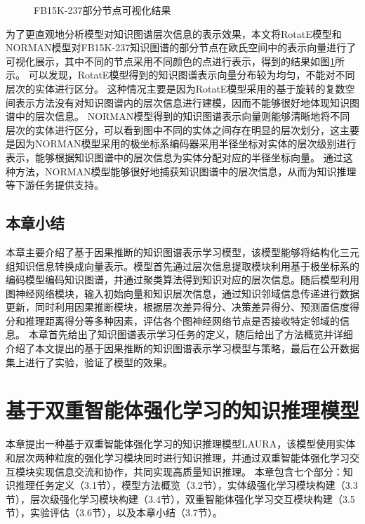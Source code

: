 \documentclass[algorithmlist, AutoFakeBold, AutoFakeSlant, figurelist, tablelist, nomlist, engineering]{seuthesix}
\begin{document}
\begin{figure}[t]
  \centering
  \caption{FB15K-237部分节点可视化结果}
  \label{Experiment1_figures}
\end{figure}
为了更直观地分析模型对知识图谱层次信息的表示效果，本文将RotatE模型和NORMAN模型对FB15K-237知识图谱的部分节点在欧氏空间中的表示向量进行了可视化展示，其中不同的节点采用不同颜色的点进行表示，得到的结果如图\ref{Experiment1_figures}所示。
可以发现，RotatE模型得到的知识图谱表示向量分布较为均匀，不能对不同层次的实体进行区分。
这种情况主要是因为RotatE模型采用的基于旋转的复数空间表示方法没有对知识图谱内的层次信息进行建模，因而不能够很好地体现知识图谱中的层次信息。
NORMAN模型得到的知识图谱表示向量则能够清晰地将不同层次的实体进行区分，可以看到图中不同的实体之间存在明显的层次划分，这主要是因为NORMAN模型采用的极坐标系编码器采用半径坐标对实体的层次级别进行表示，能够根据知识图谱中的层次信息为实体分配对应的半径坐标向量。
通过这种方法，NORMAN模型能够很好地捕获知识图谱中的层次信息，从而为知识推理等下游任务提供支持。


\section{本章小结}
本章主要介绍了基于因果推断的知识图谱表示学习模型，该模型能够将结构化三元组知识信息转换成向量表示。模型首先通过层次信息提取模块利用基于极坐标系的编码模型编码知识图谱，并通过聚类算法得到知识对应的层次信息。随后模型利用图神经网络模块，输入初始向量和知识层次信息，通过知识邻域信息传递进行数据更新，同时利用因果推断模块，根据层次差异得分、决策差异得分、预测置信度得分和推理距离得分等多种因素，评估各个图神经网络节点是否接收特定邻域的信息。
本章首先给出了知识图谱表示学习任务的定义，随后给出了方法概览并详细介绍了本文提出的基于因果推断的知识图谱表示学习模型与策略，最后在公开数据集上进行了实验，验证了模型的效果。


\chapter{基于双重智能体强化学习的知识推理模型}
本章提出一种基于双重智能体强化学习的知识推理模型LAURA，该模型使用实体和层次两种粒度的强化学习模块同时进行知识推理，并通过双重智能体强化学习交互模块实现信息交流和协作，共同实现高质量知识推理。
本章包含七个部分：知识推理任务定义（3.1节），模型方法概览（3.2节），实体级强化学习模块构建（3.3节），层次级强化学习模块构建（3.4节），双重智能体强化学习交互模块构建（3.5节），实验评估（3.6节），以及本章小结（3.7节）。
\end{document}
